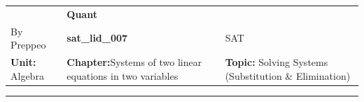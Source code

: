 \documentclass[11pt,paper=a4,answers]{exam}
\begin{document}
\begin{center}
    \centering
    \renewcommand{\arraystretch}{1.5}
    \begin{tabularx}{\textwidth}{YYY}
    & \normalsize\bf{{\Large{{Quant}}}} & \\
    By Preppeo & \normalsize\bf{{sat\_lid\_007}} & SAT\\
    \normalsize{{\textbf{{Unit:}} Algebra}} & \normalsize{{\textbf{{Chapter:}}Systems of two linear equations in two variables}} & \normalsize{{\textbf{{Topic:}} Solving Systems (Substitution \& Elimination)}} \\
    \end{tabularx}
\end{center}
\par\noindent\rule{\textwidth}{1pt}
\end{document}
